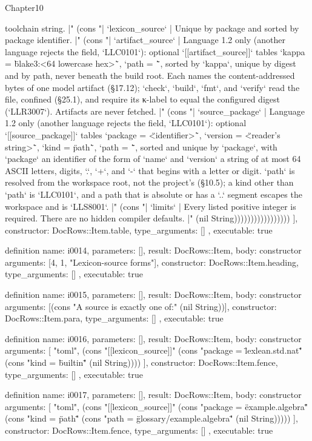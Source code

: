 \begin{lexlean}{Chapter10}
\begin{semanticmodule}
{{toolchain string. |" (cons "| `lexicon_source` | Unique by package and sorted by package identifier. |" (cons "| `artifact_source` | Language 1.2 only (another language rejects the field, `LLC0101`): optional `[[artifact_source]]` tables `kappa = \"blake3:<64 lowercase hex>\"`, `path = \"<project-relative file>\"`, sorted by `kappa`, unique by digest and by path, never beneath the build root. Each names the content-addressed bytes of one model artifact (§17.12); `check`, `build`, `fmt`, and `verify` read the file, confined (§25.1), and require its κ-label to equal the configured digest (`LLR3007`). Artifacts are never fetched. |" (cons "| `source_package` | Language 1.2 only (another language rejects the field, `LLC0101`): optional `[[source_package]]` tables `package = \"<identifier>\"`, `version = \"<reader's string>\"`, `kind = \"path\"`, `path = \"<workspace-relative member directory>\"`, sorted and unique by `package`, with `package` an identifier of the form of `name` and `version` a string of at most 64 ASCII letters, digits, `.`, `+`, and `-` that begins with a letter or digit. `path` is resolved from the workspace root, not the project's (§10.5); a kind other than `path` is `LLC0101`, and a path that is absolute or has a `..` segment escapes the workspace and is `LLS8001`. |" (cons "| `limits` | Every listed positive integer is required. There are no hidden compiler defaults. |" (nil String)))))))))))))))))
    ],
    constructor: DocRows::Item.table,
    type_arguments: []
  },
  executable: true
}

definition{
  name: i0014,
  parameters: [],
  result: DocRows::Item,
  body: constructor{
    arguments: [4, 1, "Lexicon-source forms"],
    constructor: DocRows::Item.heading,
    type_arguments: []
  },
  executable: true
}

definition{
  name: i0015,
  parameters: [],
  result: DocRows::Item,
  body: constructor{
    arguments: [(cons "A source is exactly one of:" (nil String))],
    constructor: DocRows::Item.para,
    type_arguments: []
  },
  executable: true
}

definition{
  name: i0016,
  parameters: [],
  result: DocRows::Item,
  body: constructor{
    arguments: [
      "toml",
      (cons "[[lexicon_source]]" (cons "package = \"lexlean.std.nat\"" (cons "kind = \"builtin\"" (nil String))))
    ],
    constructor: DocRows::Item.fence,
    type_arguments: []
  },
  executable: true
}

definition{
  name: i0017,
  parameters: [],
  result: DocRows::Item,
  body: constructor{
    arguments: [
      "toml",
      (cons "[[lexicon_source]]" (cons "package = \"example.algebra\"" (cons "kind = \"path\"" (cons "path = \"glossary/example.algebra\"" (nil String)))))
    ],
    constructor: DocRows::Item.fence,
    type_arguments: []
  },
  executable: true
}


\end{semanticmodule}
\end{lexlean}

